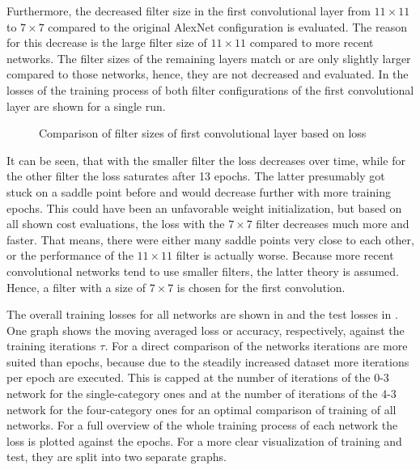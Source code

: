 Furthermore, the decreased filter size in the first convolutional layer from $11 \times 11$ to $7 \times 7$ compared to the original AlexNet configuration is evaluated.
The reason for this decrease is the large filter size of $11 \times 11$ compared to more recent networks.
The filter sizes of the remaining layers match or are only slightly larger compared to those networks, hence, they are not decreased and evaluated.
In  the losses of the training process of both filter configurations of the first convolutional layer are shown for a single run.
\begin{figure}
	\setlength{}
	\setlength{}
	\centering
	
	\caption{Comparison of filter sizes of first convolutional layer based on loss}
	\label{fig:first-conv-filter}
\end{figure}
It can be seen, that with the smaller filter the loss decreases over time, while for the other filter the loss saturates after 13 epochs.
The latter presumably got stuck on a saddle point before and would decrease further with more training epochs.
This could have been an unfavorable weight initialization, but based on all shown cost evaluations, the loss with the $7 \times 7$ filter decreases much more and faster.
That means, there were either many saddle points very close to each other, or the performance of the $11 \times 11$ filter is actually worse.
Because more recent convolutional networks tend to use smaller filters, the latter theory is assumed.
Hence, a filter with a size of $7 \times 7$ is chosen for the first convolution.

The overall training losses for all networks are shown in  and the test losses in .
One graph shows the moving averaged loss or accuracy, respectively, against the training iterations $\tau$.
For a direct comparison of the networks iterations are more suited than epochs, because due to the steadily increased dataset more iterations per epoch are executed. 
This is capped at the number of iterations of the 0-3 network for the single-category ones and at the number of iterations of the 4-3 network for the four-category ones for an optimal comparison of training of all networks.
For a full overview of the whole training process of each network the loss is plotted against the epochs.
For a more clear visualization of training and test, they are split into two separate graphs.

